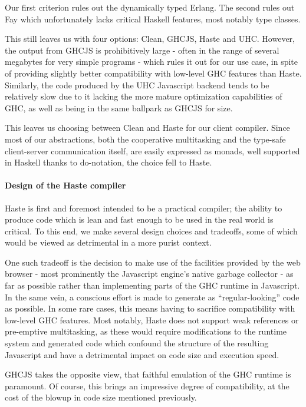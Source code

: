 \documentclass[preprint]{sigplanconf}
\begin{document}
Our first criterion rules out the dynamically typed Erlang. The second rules
out Fay which unfortunately lacks critical Haskell features, most notably type
classes.

This still leaves us with four options: Clean, GHCJS, Haste and UHC. However,
the output from GHCJS is prohibitively large - often in the range of several
megabytes for very simple programs - which rules it out for our use case, in
spite of providing slightly better compatibility with low-level GHC features
than Haste. Similarly, the code produced by the UHC Javascript backend tends to
be relatively slow due to it lacking the more mature optimization capabilities
of GHC, as well as being in the same ballpark as GHCJS for size.\ \cite{haste}

This leaves us choosing between Clean and Haste for our client compiler. Since
most of our abstractions, both the cooperative multitasking and the type-safe
client-server communication itself, are easily expressed as monads, well
supported in Haskell thanks to do-notation, the choice fell to Haste.

\paragraph{Design of the Haste compiler} Haste is first and foremost intended
to be a practical compiler; the ability to produce code which is lean and fast
enough to be used in the real world is critical. To this end, we make several
design choices and tradeoffs, some of which would be viewed as detrimental in a
more purist context.

One such tradeoff is the decision to make use of the facilities provided by the
web browser - most prominently the Javascript engine's native garbage
collector - as far as possible rather than implementing parts of the GHC
runtime in Javascript. In the same vein, a conscious effort is made to generate
as ``regular-looking'' code as possible. In some rare cases, this means having
to sacrifice compatibility with low-level GHC features. Most notably, Haste
does not support weak references or pre-emptive multitasking, as these would
require modifications to the runtime system and generated code which confound
the structure of the resulting Javascript and have a detrimental impact on code
size and execution speed.

GHCJS takes the opposite view, that faithful emulation of the GHC runtime is
paramount. Of course, this brings an impressive degree of compatibility, at the
cost of the blowup in code size mentioned previously.
\end{document}
